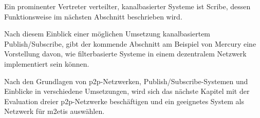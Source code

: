 Ein prominenter Vertreter verteilter, kanalbasierter Systeme ist Scribe, dessen Funktionsweise im nächsten Abschnitt beschrieben wird.



Nach diesem Einblick einer möglichen Umsetzung kanalbasiertem Publish/Subscribe, gibt der kommende Abschnitt am Beispiel von Mercury eine Vorstellung davon, wie filterbasierte Systeme in einem dezentralem Netzwerk implementiert sein können.





Nach den Grundlagen von \ac{p2p}-Netzwerken, Publish/Subscribe-Systemen und Einblicke in verschiedene Umsetzungen, wird sich das nächste Kapitel mit der Evaluation dreier \ac{p2p}-Netzwerke beschäftigen und ein geeignetes System als Netzwerk für \ac{m2etis} auswählen.
